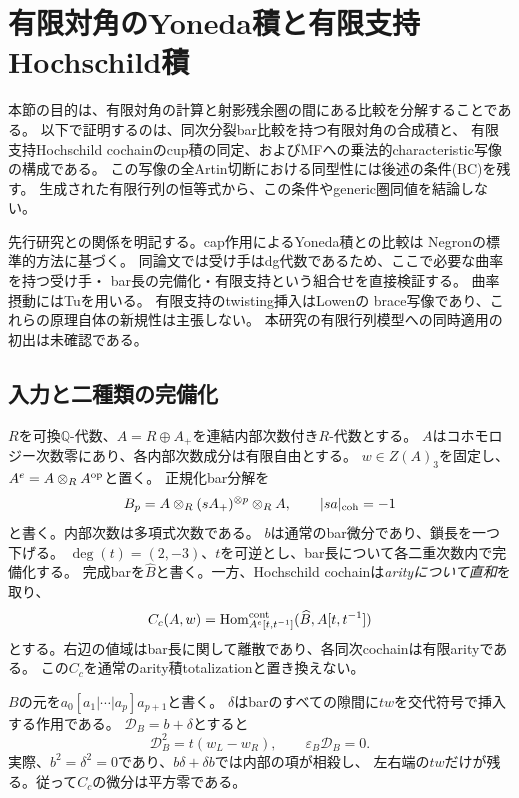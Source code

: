 \section{有限対角のYoneda積と有限支持Hochschild積}
\label{mb:sec:comparison}

本節の目的は、有限対角の計算と射影残余圏の間にある比較を分解することである。
以下で証明するのは、同次分裂bar比較を持つ有限対角の合成積と、
有限支持Hochschild cochainのcup積の同定、およびMFへの乗法的characteristic写像の構成である。
この写像の全Artin切断における同型性には後述の条件(BC)を残す。
生成された有限行列の恒等式から、この条件やgeneric圏同値を結論しない。

先行研究との関係を明記する。cap作用によるYoneda積との比較は
Negron\cite[Theorem~5.3]{MBNegron}の標準的方法に基づく。
同論文では受け手はdg代数であるため、ここで必要な曲率を持つ受け手・
bar長の完備化・有限支持という組合せを直接検証する。
曲率摂動にはTu\cite[Appendix~A, Lemma~A.1]{MBTu}を用いる。
有限支持のtwisting挿入はLowen\cite[Propositions~3.11, 3.13]{MBLowen}の
brace写像であり、これらの原理自体の新規性は主張しない。
本研究の有限行列模型への同時適用の初出は未確認である。

\subsection{入力と二種類の完備化}
$R$を可換$\mathbb Q$-代数、$A=R\oplus A_+$を連結内部次数付き$R$-代数とする。
$A$はコホモロジー次数零にあり、各内部次数成分は有限自由とする。
$w\in Z(A)_3$を固定し、$A^e=A\otimes_R A^{\rm op}$と置く。
正規化bar分解を
\[
 B_p=A\otimes_R(sA_+)^{\otimes p}\otimes_R A,
 \qquad |s a|_{\rm coh}=-1
\]
と書く。内部次数は多項式次数である。
$b$は通常のbar微分であり、鎖長を一つ下げる。
$\deg(t)=(2,-3)$、$t$を可逆とし、bar長について各二重次数内で完備化する。
完成barを$\widehat B$と書く。一方、Hochschild cochainは\emph{arityについて直和}を取り、
\[
 C_c(A,w)=\operatorname{Hom}^{\rm cont}_{A^e[t,t^{-1}]}(\widehat B,A[t,t^{-1}])
\]
とする。右辺の値域はbar長に関して離散であり、各同次cochainは有限arityである。
この$C_c$を通常のarity積totalizationと置き換えない。

$B$の元を$a_0[a_1|\cdots|a_p]a_{p+1}$と書く。
$\delta$はbarのすべての隙間に$t w$を交代符号で挿入する作用である。
$\mathcal D_B=b+\delta$とすると
\begin{equation}\label{mb:eq:bar-curvature}
 \mathcal D_B^2=t(w_L-w_R),\qquad \varepsilon_B\mathcal D_B=0.
\end{equation}
実際、$b^2=\delta^2=0$であり、$b\delta+\delta b$では内部の項が相殺し、
左右端の$tw$だけが残る。従って$C_c$の微分は平方零である。


